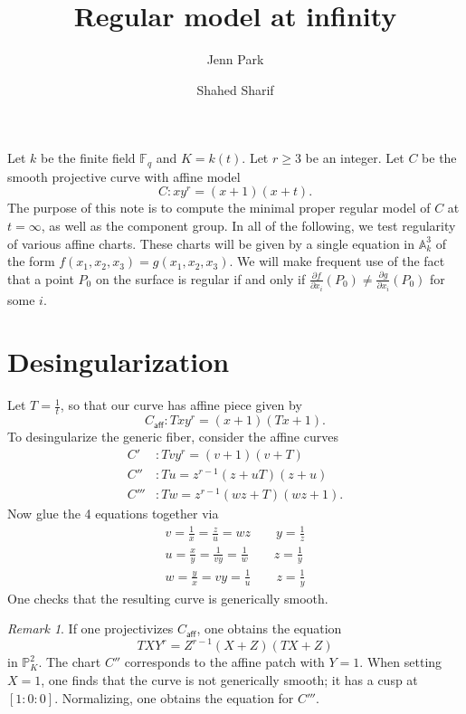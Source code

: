 \documentclass[pagesize,paper=letter]{scrartcl}
\newcommand{\caff}{C_{\textsf{aff}}}
\theoremstyle{plain}
\theoremstyle{definition}
\theoremstyle{remark}
\newtheorem{remark}[theorem]{Remark}
\newcommand{\F}{\ensuremath{\mathbb{F}}}
\newcommand{\Pro}{\ensuremath{\mathbb{P}}}
\begin{document}
\title{Regular model at infinity}
\author{Jenn Park \and Shahed Sharif}
\maketitle

Let $k$ be the finite field $\F_q$ and $K = k(t)$. Let $r \geq 3$ be an integer. Let $C$ be the smooth projective curve with affine model
\[
C: xy^r = (x+1)(x+t).
\]
The purpose of this note is to compute the minimal proper regular model of $C$ at $t = \infty$, as well as the component group. In all of the following, we test regularity of various affine charts. These charts will be given by a single equation in $\mathbb{A}^3_k$ of the form $f(x_1,x_2,x_3) = g(x_1,x_2,x_3)$. We will make frequent use of the fact that a point $P_0$ on the surface is regular if and only if $\frac{\partial f}{\partial x_i}(P_0) \neq \frac{\partial g}{\partial x_i}(P_0)$ for some $i$.

\section{Desingularization}
\label{sec:desingularization}

Let $T = \frac{1}{t}$, so that our curve has affine piece given by
\[
\caff:Txy^r = (x+1)(Tx+1).
\]
To desingularize the generic fiber, consider the affine curves
\begin{align*}
  C'&: Tvy^r = (v+1)(v+T) \\
  C''&: Tu = z^{r-1}(z+uT)(z+u) \\
  C'''&: Tw = z^{r-1}(wz+T)(wz+1).
\end{align*}
Now glue the 4 equations together via
\begin{gather*}
  v = \frac{1}{x} = \frac{z}{u} = wz \qquad y = \frac{1}{z} \\
  u = \frac{x}{y} = \frac{1}{vy} = \frac{1}{w} \qquad z = \frac{1}{y}\\
  w = \frac{y}{x} = vy = \frac{1}{u} \qquad z = \frac{1}{y}
\end{gather*}
One checks that the resulting curve is generically smooth.
\begin{remark}
  If one projectivizes $\caff$, one obtains the equation
  \[
  TXY^r = Z^{r-1}(X+Z)(TX+Z)
  \]
  in $\Pro^2_K$. The chart $C''$ corresponds to the affine patch with $Y = 1$. When setting $X = 1$, one finds that the curve is not generically smooth; it has a cusp at $[1:0:0]$. Normalizing, one obtains the equation for $C'''$. 
\end{remark}
\end{document}
